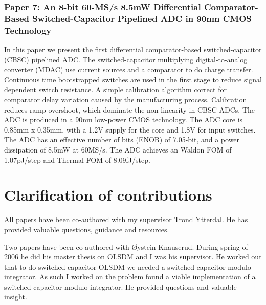 \subsubsection{Paper 7: An 8-bit 60-MS/s 8.5mW Differential Comparator-Based Switched-Capacitor
  Pipelined ADC in 90nm CMOS Technology}
In this paper we present the first differential comparator-based switched-capacitor (CBSC) pipelined ADC. The switched-capacitor multiplying
digital-to-analog converter (MDAC)
use current sources and a comparator to do charge transfer. Continuous
time bootstrapped switches are used in the first stage to reduce signal dependent switch
resistance. A simple calibration algorithm correct for
comparator delay variation caused by the manufacturing process. Calibration reduces
ramp overshoot, which dominate the non-linearity in CBSC ADCs. The ADC is produced in a 90nm
low-power CMOS technology. The ADC core is 0.85mm x 0.35mm, with a
1.2V supply for the core and 1.8V for input switches. The ADC
has an effective number of bits (ENOB) of 7.05-bit, and a power
dissipation of 8.5mW at 60MS/s. The ADC achieves an Waldon FOM of
1.07pJ/step and Thermal FOM of 8.09fJ/step. 


\section{Clarification of contributions}
All papers have been co-authored with my supervisor Trond Ytterdal. He
has provided valuable questions, guidance and resources. 

Two papers have been co-authored with {\O}ystein Knauserud. During spring
of 2006 he did his master thesis on OLSDM and I was his supervisor. He worked out that to do
switched-capacitor OLSDM we needed a switched-capacitor modulo
integrator. As such I worked on the problem found a viable
implementation of a 
switched-capacitor modulo integrator. He provided questions and
valuable insight. 





